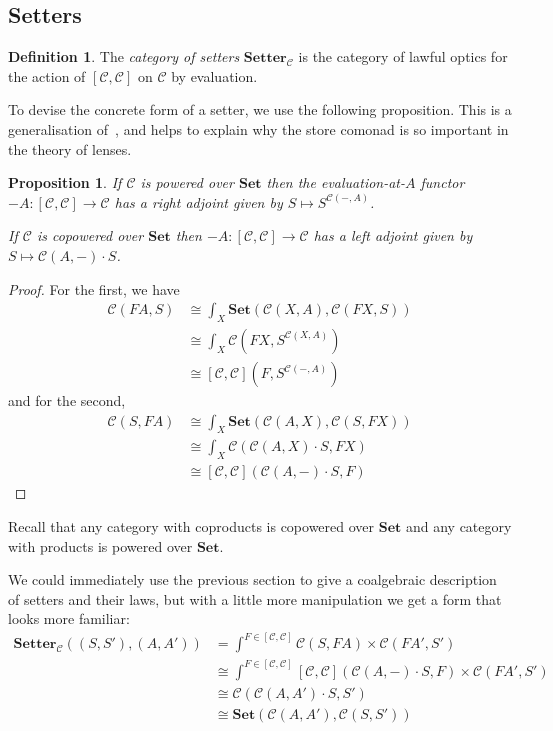 \documentclass[11pt,letterpaper]{article}
\theoremstyle{plain}
\newtheorem{proposition}[theorem]{Proposition}
\theoremstyle{definition}
\newtheorem{definition}[theorem]{Definition}
\newcommand{\C}{\mathscr{C}}
\newcommand{\Set}{\mathbf{Set}}
\newcommand{\Setter}{\mathbf{Setter}}
\begin{document}
\subsection{Setters}\label{sec:setters}

\begin{definition}
  The \emph{category of setters} $\Setter_\C$ is the category of lawful optics for the action of $[\C, \C]$ on $\C$ by evaluation.
\end{definition}

To devise the concrete form of a setter, we use the following proposition. This is a generalisation of~\cite[Proposition 2.2]{SecondOrderFunctionals}, and helps to explain why the store comonad is so important in the theory of lenses.

\begin{proposition}
If $\C$ is powered over $\Set$ then the evaluation-at-$A$ functor $-A : [\C, \C] \to \C$ has a right adjoint given by $S \mapsto S^{\C(-, A)}$.

If $\C$ is copowered over $\Set$ then $-A : [\C, \C] \to \C$ has a left adjoint given by $S \mapsto \C(A, -) \cdot S$.
\end{proposition}
\begin{proof}
For the first, we have
\begin{align*}
\C(FA, S)
&\cong \int_X \Set(\C(X, A), \C(FX, S)) \\
&\cong \int_X \C(FX, S^{\C(X, A)}) \\
&\cong [\C, \C](F, S^{\C(-, A)})
\end{align*}
and for the second,
\begin{align*}
\C(S, FA)
&\cong \int_X \Set(\C(A, X), \C(S, FX)) \\
&\cong \int_X \C(\C(A, X) \cdot S, FX) \\
&\cong [\C, \C](\C(A, -) \cdot S, F)
\end{align*}
\end{proof}

Recall that any category with coproducts is copowered over $\Set$ and any category with products is powered over $\Set$.

We could immediately use the previous section to give a coalgebraic description of setters and their laws, but with a little more manipulation we get a form that looks more familiar:
\begin{align*}
  \Setter_\C((S, S'), (A, A')) &= \int^{F \in [\C, \C]} \C(S, FA) \times \C(FA', S') \\
                               &\cong \int^{F \in [\C, \C]} [\C, \C](\C(A, -) \cdot S, F) \times \C(FA', S') \\
                               &\cong \C(\C(A, A') \cdot S, S') \\
                               &\cong \Set(\C(A, A'), \C(S, S'))
\end{align*}
\end{document}

